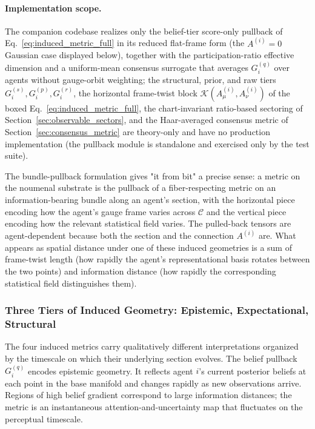 \documentclass[11pt]{article}
\begin{document}
\paragraph{Implementation scope.} The companion codebase realizes only the belief-tier score-only pullback of Eq.~\eqref{eq:induced_metric_full} in its reduced flat-frame form (the $A^{(i)} = 0$ Gaussian case displayed below), together with the participation-ratio effective dimension and a uniform-mean consensus surrogate that averages $G_i^{(q)}$ over agents without gauge-orbit weighting; the structural, prior, and raw tiers $G_i^{(s)}, G_i^{(p)}, G_i^{(r)}$, the horizontal frame-twist block $\mathcal{K}(A^{(i)}_\mu, A^{(i)}_\nu)$ of the boxed Eq.~\eqref{eq:induced_metric_full}, the chart-invariant ratio-based sectoring of Section~\ref{sec:observable_sectors}, and the Haar-averaged consensus metric of Section~\ref{sec:consensus_metric} are theory-only and have no production implementation (the pullback module is standalone and exercised only by the test suite).

The bundle-pullback formulation gives "it from bit" a precise sense: a metric on the noumenal substrate is the pullback of a fiber-respecting metric on an information-bearing bundle along an agent's section, with the horizontal piece encoding how the agent's gauge frame varies across $\mathcal{C}$ and the vertical piece encoding how the relevant statistical field varies. The pulled-back tensors are agent-dependent because both the section and the connection $A^{(i)}$ are. What appears as spatial distance under one of these induced geometries is a sum of frame-twist length (how rapidly the agent's representational basis rotates between the two points) and information distance (how rapidly the corresponding statistical field distinguishes them).

\subsubsection{Three Tiers of Induced Geometry: Epistemic, Expectational, Structural}
\label{sec:three_tiers}

The four induced metrics carry qualitatively different interpretations organized by the timescale on which their underlying section evolves. The belief pullback $G_i^{(q)}$ encodes epistemic geometry. It reflects agent $i$'s current posterior beliefs at each point in the base manifold and changes rapidly as new observations arrive. Regions of high belief gradient correspond to large information distances; the metric is an instantaneous attention-and-uncertainty map that fluctuates on the perceptual timescale.
\end{document}
